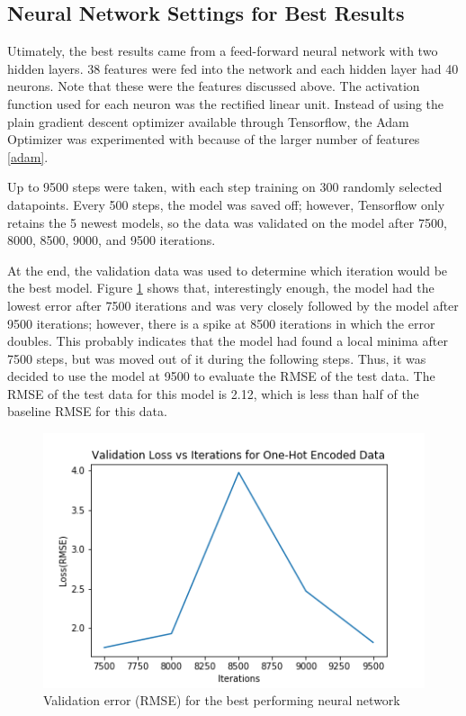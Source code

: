 \documentclass[conference]{IEEEtran}
\begin{document}
\subsection{Neural Network Settings for Best Results}
Utimately, the best results came from a feed-forward neural network with two hidden layers.  38 features were fed into the network and each hidden layer had 40 neurons.  Note that these were the features discussed above.  The activation function used for each neuron was the rectified linear unit.  Instead of using the plain gradient descent optimizer available through Tensorflow, the Adam Optimizer was experimented with because of the larger number of features \ref{adam}.  

Up to 9500 steps were taken, with each step training on 300 randomly selected datapoints.  Every 500 steps, the model was saved off; however, Tensorflow only retains the 5 newest models, so the data was validated on the model after 7500, 8000, 8500, 9000, and 9500 iterations.

At the end, the validation data was used to determine which iteration would be the best model.  Figure \ref{ohAcc} shows that, interestingly enough, the model had the lowest error after 7500 iterations and was very closely followed by the model after 9500 iterations; however, there is a spike at 8500 iterations in which the error doubles.  This probably indicates that the model had found a local minima after 7500 steps, but was moved out of it during the following steps.  Thus, it was decided  to use the model at 9500 to evaluate the RMSE of the test data.  The RMSE of the test data for this model is 2.12, which is less than half of the baseline RMSE for this data.

 \begin{figure}
  \centering
    \includegraphics[width=\linewidth]{reluOneHotAdam.png}
      \caption{Validation error (RMSE) for the best performing neural network}
      \label{ohAcc}
\end{figure}
\end{document}

